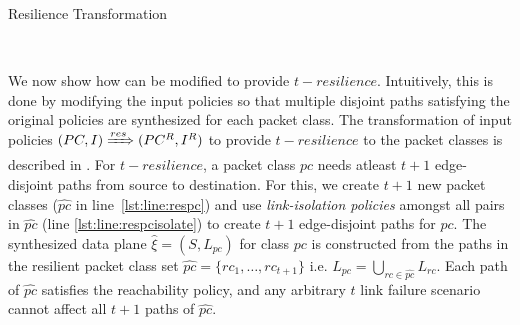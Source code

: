\begin{algorithm}[h]
	\begin{footnotesize}
		\caption{Resilience Transformation}
		\label{restransform}
		\begin{algorithmic}[1]
			\vspace*{0.25cm}
			 \label{lst:line:respc}
			  \label{lst:line:respcisolate}
			 \label{lst:line:respcend}
			\EndFor
			 \label{lst:line:respolicy}
			\EndFor \\
		\end{algorithmic}
	\end{footnotesize}
\end{algorithm}

 We now show how \Name can be modified to provide $t-resilience$.
Intuitively, this  is done by modifying the input policies so that  multiple disjoint paths satisfying the original
policies are synthesized for each packet class.
\noindent The transformation of input policies $(PC, I) \xRightarrow{res} (PC^R, I^R)$
to provide $t-resilience$ to the packet classes is described in . 
For $t-resilience$, a packet class $pc$ needs atleast $t+1$ edge-disjoint paths from
source to destination. For this, we create $t+1$ new packet classes ($\hat{pc}$ in line~\ref{lst:line:respc})
and use {\em link-isolation policies} amongst all pairs in $\hat{pc}$ (line \ref{lst:line:respcisolate})
to create $t+1$ edge-disjoint paths for $pc$.
The synthesized data plane $\hat{\xi} = (S, L_{pc})$ for class $pc$ is constructed from the 
paths in the resilient packet class set $\hat{pc} = \{rc_1,\ldots,rc_{t+1}\}$
i.e. $L_{pc} = \bigcup\limits_{rc \in \hat{pc}} L_{rc}$.  
Each path of $\hat{pc}$ satisfies the reachability policy, 
and any arbitrary $t$ link failure scenario cannot affect all $t+1$ paths of $\hat{pc}$.

